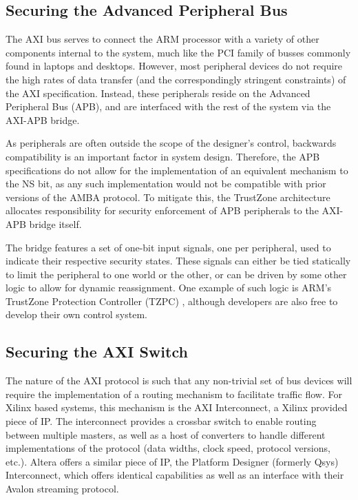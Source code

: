 \documentclass[journal]{IEEEtran}
\begin{document}
\subsection{Securing the Advanced Peripheral Bus} \label{sec:Securing APB Bus}
The AXI bus serves to connect the ARM processor with a variety of other components
internal to the system, much like the PCI family of busses commonly found in laptops and
desktops. However, most peripheral devices do not require the high rates of data transfer
(and the correspondingly stringent constraints) of the AXI specification. Instead, these
peripherals reside on the Advanced Peripheral Bus (APB), and are interfaced with the rest
of the system via the AXI-APB bridge.\cite{noauthor_arm_nodate}

As peripherals are often outside the scope of the designer's control, backwards
compatibility is an important factor in system design. Therefore, the APB specifications
do not allow for the implementation of an equivalent mechanism to the NS bit, as any such
implementation would not be compatible with prior versions of the AMBA protocol. To 
mitigate this, the TrustZone architecture allocates responsibility for security
enforcement of APB peripherals to the AXI-APB bridge itself.

The bridge features a set of one-bit input signals, one per peripheral, used to indicate
their respective security states. These signals can either be tied statically to limit
the peripheral to one world or the other, or can be driven by some other logic to allow
for dynamic reassignment. One example of such logic is ARM's TrustZone Protection 
Controller (TZPC) \cite{noauthor_arm_nodate}, although developers are also free to develop
their own control system.

\subsection{Securing the AXI Switch} \label{sec:Securing AXI Switch}
The nature of the AXI protocol is such that any non-trivial set of bus devices will
require the implementation of a routing mechanism to facilitate traffic flow. For Xilinx
based systems, this mechanism is the AXI Interconnect, a Xilinx provided piece of IP. 
\cite{noauthor_axi_2017} The interconnect provides a crossbar switch to enable routing 
between multiple masters, as well as a host of converters to handle different 
implementations of the protocol (data widths, clock speed, protocol versions, etc.). 
Altera offers a similar piece of IP, the Platform Designer (formerly Qsys) Interconnect,
which offers identical capabilities as well as an interface with their Avalon streaming
protocol. \cite{noauthor_intel_nodate}
\end{document}
